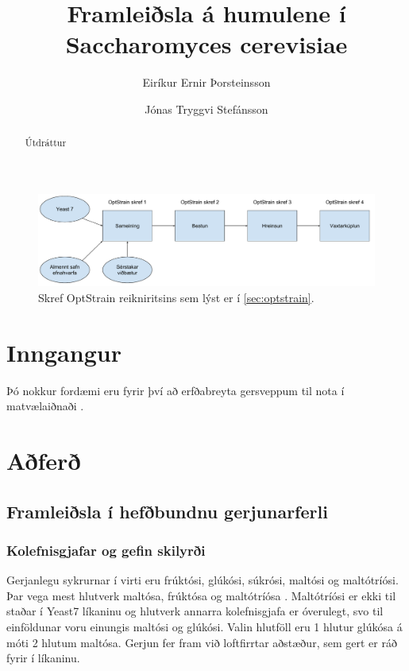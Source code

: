 \documentclass[12pt]{article}
\title{Framleiðsla á humulene í Saccharomyces cerevisiae}
\author{Eiríkur Ernir Þorsteinsson \and Jónas Tryggvi Stefánsson}
\begin{document}
\maketitle

\begin{abstract}
Útdráttur
\end{abstract}


\begin{figure}
\caption[OptStrain reikniritið]{Skref OptStrain reikniritsins sem lýst er í \ref{sec:optstrain}.}
\label{fig:flaedirit}
\includegraphics[width=\textwidth]{Pics/OptStrainOverview}
\end{figure}


\section{Inngangur}

Þó nokkur fordæmi eru fyrir því að erfðabreyta gersveppum til nota í matvælaiðnaði \cite{dequin2001potential}.

\section{Aðferð}
\subsection{Framleiðsla í hefðbundnu gerjunarferli}
\subsubsection{Kolefnisgjafar og gefin skilyrði}
Gerjanlegu sykrurnar í virti eru frúktósi, glúkósi, súkrósi, maltósi og maltótríósi. Þar vega mest hlutverk maltósa, frúktósa og maltótríósa \cite{otter1967determination}. Maltótríósi er ekki til staðar í Yeast7 líkaninu og hlutverk annarra kolefnisgjafa er óverulegt, svo til einföldunar voru einungis maltósi og glúkósi. Valin hlutföll eru 1 hlutur glúkósa á móti 2 hlutum maltósa. Gerjun fer fram við loftfirrtar aðstæður, sem gert er ráð fyrir í líkaninu.
\end{document}

